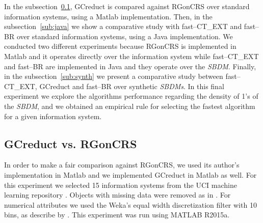 \documentclass[authoryear,preprint,review,12pt]{elsarticle}
\begin{document}
	In the subsection~\ref{sub:matlab}, GCreduct is compared against RGonCRS over standard information systems, using a Matlab implementation. Then, in the subsection~\ref{sub:java} we show a comparative study with fast--CT\_EXT and fast--BR over standard information systems, using a Java implementation. We conducted two different experiments because RGonCRS is implemented in Matlab and it operates directly over the information system while fast--CT\_EXT and fast--BR are implemented in Java and they operate over the \textit{SBDM}. Finally, in the subsection~\ref{sub:synth} we present a comparative study between fast--CT\_EXT, GCreduct and fast--BR over synthetic \textit{SBDMs}. In this final experiment we explore the algorithms performance regarding the density of 1's of the \textit{SBDM}, and we obtained an empirical rule for selecting the fastest algorithm for a given information system.
	
\subsection{GCreduct vs. RGonCRS}\label{sub:matlab}
	In order to make a fair comparison against RGonCRS, we used its author's implementation in Matlab and we implemented GCreduct in Matlab as well. For this experiment we selected 15 information systems from the UCI machine learning repository \citep{Bache13}. Objects with missing data were removed as in \citep{WangP07}. For numerical attributes we used the Weka's equal width discretization filter with 10 bins, as describe by \cite{Flores2010}. This experiment was run using MATLAB R2015a.
	
\end{document}
